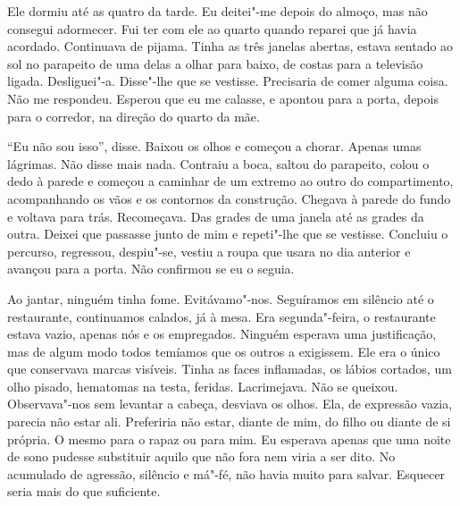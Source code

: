 Ele dormiu até as quatro da tarde. Eu deitei"-me depois do almoço, mas
não consegui adormecer. Fui ter com ele ao quarto quando reparei que já
havia acordado. Continuava de pijama. Tinha as três janelas abertas,
estava sentado ao sol no parapeito de uma delas a olhar para baixo, de
costas para a televisão ligada. Desliguei"-a. Disse"-lhe que se
vestisse. Precisaria de comer alguma coisa. Não me respondeu. Esperou
que eu me calasse, e apontou para a porta, depois para o corredor, na
direção do quarto da mãe.

``Eu não sou isso'',
disse. Baixou os olhos e começou a chorar. Apenas umas lágrimas. Não
disse mais nada. Contraiu a boca, saltou do parapeito, colou o dedo à
parede e começou a caminhar de um extremo ao outro do compartimento,
acompanhando os vãos e os contornos da construção. Chegava à parede do
fundo e voltava para trás. Recomeçava. Das grades de uma janela até as
grades da outra. Deixei que passasse junto de mim e repeti"-lhe que se
vestisse. Concluiu o percurso, regressou, despiu"-se, vestiu a roupa que
usara no dia anterior e avançou para a porta. Não confirmou se eu o
seguia.

Ao jantar, ninguém tinha fome. Evitávamo"-nos. Seguíramos em silêncio
até o restaurante, continuamos calados, já à mesa. Era segunda"-feira,
o restaurante estava vazio, apenas nós e os empregados. Ninguém esperava
uma justificação, mas de algum modo todos temíamos que os outros a
exigissem. Ele era o único que conservava marcas visíveis. Tinha as
faces inflamadas, os lábios cortados, um olho pisado, hematomas na
testa, feridas. Lacrimejava. Não se queixou. Observava"-nos sem levantar
a cabeça, desviava os olhos. Ela, de expressão vazia, parecia não estar
ali. Preferiria não estar, diante de mim, do filho ou diante de si
própria. O mesmo para o rapaz ou para mim. Eu esperava apenas que uma
noite de sono pudesse substituir aquilo que não fora nem viria a ser
dito. No acumulado de agressão, silêncio e má"-fé, não havia muito para
salvar. Esquecer seria mais do que suficiente.

